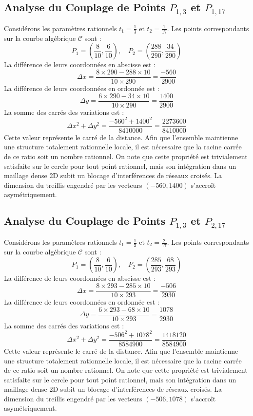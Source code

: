 \documentclass[12pt, a4paper]{article}
\begin{document}
\subsection{Analyse du Couplage de Points $P_{1,3}$ et $P_{1,17}$}
Considérons les paramètres rationnels $t_1 = \frac{1}{3}$ et $t_2 = \frac{1}{17}$.
Les points correspondants sur la courbe algébrique $\mathcal{C}$ sont :
$$ P_1 = \left( \frac{8}{10}, \frac{6}{10} \right), \quad P_2 = \left( \frac{288}{290}, \frac{34}{290} \right) $$
La différence de leurs coordonnées en abscisse est :
$$ \Delta x = \frac{8 \times 290 - 288 \times 10}{10 \times 290} = \frac{-560}{2900} $$
La différence de leurs coordonnées en ordonnée est :
$$ \Delta y = \frac{6 \times 290 - 34 \times 10}{10 \times 290} = \frac{1400}{2900} $$
La somme des carrés des variations est :
$$ \Delta x^2 + \Delta y^2 = \frac{ -560^2 + 1400^2 }{ 8410000 } = \frac{ 2273600 }{ 8410000 } $$
Cette valeur représente le carré de la distance. Afin que l'ensemble maintienne une structure totalement rationnelle locale, il est nécessaire que la racine carrée de ce ratio soit un nombre rationnel. On note que cette propriété est trivialement satisfaite sur le cercle pour tout point rationnel, mais son intégration dans un maillage dense 2D subit un blocage d'interférences de réseaux croisés. La dimension du treillis engendré par les vecteurs $( -560, 1400 )$ s'accroît asymétriquement.


\subsection{Analyse du Couplage de Points $P_{1,3}$ et $P_{2,17}$}
Considérons les paramètres rationnels $t_1 = \frac{1}{3}$ et $t_2 = \frac{2}{17}$.
Les points correspondants sur la courbe algébrique $\mathcal{C}$ sont :
$$ P_1 = \left( \frac{8}{10}, \frac{6}{10} \right), \quad P_2 = \left( \frac{285}{293}, \frac{68}{293} \right) $$
La différence de leurs coordonnées en abscisse est :
$$ \Delta x = \frac{8 \times 293 - 285 \times 10}{10 \times 293} = \frac{-506}{2930} $$
La différence de leurs coordonnées en ordonnée est :
$$ \Delta y = \frac{6 \times 293 - 68 \times 10}{10 \times 293} = \frac{1078}{2930} $$
La somme des carrés des variations est :
$$ \Delta x^2 + \Delta y^2 = \frac{ -506^2 + 1078^2 }{ 8584900 } = \frac{ 1418120 }{ 8584900 } $$
Cette valeur représente le carré de la distance. Afin que l'ensemble maintienne une structure totalement rationnelle locale, il est nécessaire que la racine carrée de ce ratio soit un nombre rationnel. On note que cette propriété est trivialement satisfaite sur le cercle pour tout point rationnel, mais son intégration dans un maillage dense 2D subit un blocage d'interférences de réseaux croisés. La dimension du treillis engendré par les vecteurs $( -506, 1078 )$ s'accroît asymétriquement.
\end{document}
